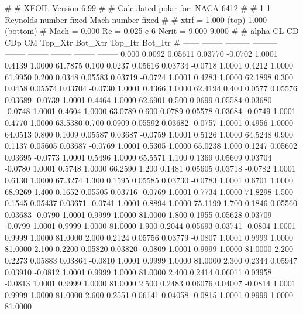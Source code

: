 #  
#       XFOIL         Version 6.99
#  
# Calculated polar for: NACA 6412                                       
#  
# 1 1 Reynolds number fixed          Mach number fixed         
#  
# xtrf =   1.000 (top)        1.000 (bottom)  
# Mach =   0.000     Re =     0.025 e 6     Ncrit =   9.000  9.000
#  
#   alpha    CL        CD       CDp       CM     Top_Xtr  Bot_Xtr  Top_Itr  Bot_Itr
#  ------ -------- --------- --------- -------- -------- -------- -------- --------
   0.000   0.0092   0.05611   0.03770  -0.0702   1.0001   0.4139   1.0000  61.7875
   0.100   0.0237   0.05616   0.03734  -0.0718   1.0001   0.4212   1.0000  61.9950
   0.200   0.0348   0.05583   0.03719  -0.0724   1.0001   0.4283   1.0000  62.1898
   0.300   0.0458   0.05574   0.03704  -0.0730   1.0001   0.4366   1.0000  62.4194
   0.400   0.0577   0.05576   0.03689  -0.0739   1.0001   0.4464   1.0000  62.6901
   0.500   0.0699   0.05584   0.03680  -0.0748   1.0001   0.4604   1.0000  63.0789
   0.600   0.0789   0.05578   0.03684  -0.0749   1.0001   0.4770   1.0000  63.5380
   0.700   0.0909   0.05592   0.03682  -0.0757   1.0001   0.4956   1.0000  64.0513
   0.800   0.1009   0.05587   0.03687  -0.0759   1.0001   0.5126   1.0000  64.5248
   0.900   0.1137   0.05605   0.03687  -0.0769   1.0001   0.5305   1.0000  65.0238
   1.000   0.1247   0.05602   0.03695  -0.0773   1.0001   0.5496   1.0000  65.5571
   1.100   0.1369   0.05609   0.03704  -0.0780   1.0001   0.5748   1.0000  66.2590
   1.200   0.1481   0.05605   0.03718  -0.0782   1.0001   0.6130   1.0000  67.3274
   1.300   0.1595   0.05585   0.03730  -0.0783   1.0001   0.6701   1.0000  68.9269
   1.400   0.1652   0.05505   0.03716  -0.0769   1.0001   0.7734   1.0000  71.8298
   1.500   0.1545   0.05437   0.03671  -0.0741   1.0001   0.8894   1.0000  75.1199
   1.700   0.1846   0.05560   0.03683  -0.0790   1.0001   0.9999   1.0000  81.0000
   1.800   0.1955   0.05628   0.03709  -0.0799   1.0001   0.9999   1.0000  81.0000
   1.900   0.2044   0.05693   0.03741  -0.0804   1.0001   0.9999   1.0000  81.0000
   2.000   0.2124   0.05756   0.03779  -0.0807   1.0001   0.9999   1.0000  81.0000
   2.100   0.2200   0.05820   0.03820  -0.0809   1.0001   0.9999   1.0000  81.0000
   2.200   0.2273   0.05883   0.03864  -0.0810   1.0001   0.9999   1.0000  81.0000
   2.300   0.2344   0.05947   0.03910  -0.0812   1.0001   0.9999   1.0000  81.0000
   2.400   0.2414   0.06011   0.03958  -0.0813   1.0001   0.9999   1.0000  81.0000
   2.500   0.2483   0.06076   0.04007  -0.0814   1.0001   0.9999   1.0000  81.0000
   2.600   0.2551   0.06141   0.04058  -0.0815   1.0001   0.9999   1.0000  81.0000
